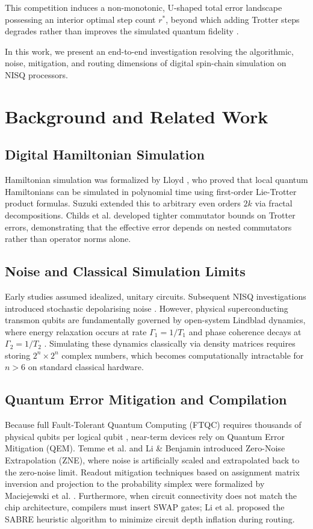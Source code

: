 \documentclass[conference]{IEEEtran}
\begin{document}
This competition induces a non-monotonic, U-shaped total error landscape possessing an interior optimal step count $r^*$, beyond which adding Trotter steps degrades rather than improves the simulated quantum fidelity \cite{heyl2019}.

In this work, we present an end-to-end investigation resolving the algorithmic, noise, mitigation, and routing dimensions of digital spin-chain simulation on NISQ processors.

\section{Background and Related Work}
\subsection{Digital Hamiltonian Simulation}
Hamiltonian simulation was formalized by Lloyd \cite{lloyd1996}, who proved that local quantum Hamiltonians can be simulated in polynomial time using first-order Lie-Trotter product formulas. Suzuki \cite{suzuki1991} extended this to arbitrary even orders $2k$ via fractal decompositions. Childs et al. \cite{childs2021} developed tighter commutator bounds on Trotter errors, demonstrating that the effective error depends on nested commutators rather than operator norms alone.

\subsection{Noise and Classical Simulation Limits}
Early studies assumed idealized, unitary circuits. Subsequent NISQ investigations introduced stochastic depolarising noise \cite{barends2015}. However, physical superconducting transmon qubits are fundamentally governed by open-system Lindblad dynamics, where energy relaxation occurs at rate $\Gamma_1 = 1/T_1$ and phase coherence decays at $\Gamma_2 = 1/T_2$ \cite{krantz2019}. Simulating these dynamics classically via density matrices requires storing $2^n \times 2^n$ complex numbers, which becomes computationally intractable for $n > 6$ on standard classical hardware.

\subsection{Quantum Error Mitigation and Compilation}
Because full Fault-Tolerant Quantum Computing (FTQC) requires thousands of physical qubits per logical qubit \cite{fowler2012}, near-term devices rely on Quantum Error Mitigation (QEM). Temme et al. \cite{temme2017} and Li \& Benjamin \cite{li2017} introduced Zero-Noise Extrapolation (ZNE), where noise is artificially scaled and extrapolated back to the zero-noise limit. Readout mitigation techniques based on assignment matrix inversion and projection to the probability simplex were formalized by Maciejewski et al. \cite{maciejewski2020}. Furthermore, when circuit connectivity does not match the chip architecture, compilers must insert SWAP gates; Li et al. \cite{li2019} proposed the SABRE heuristic algorithm to minimize circuit depth inflation during routing.
\end{document}
